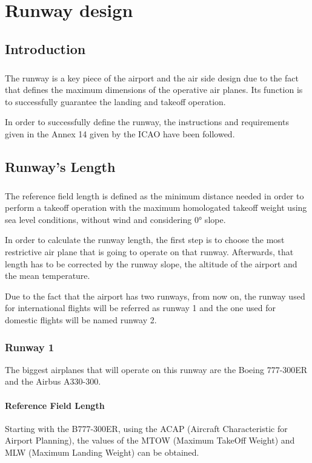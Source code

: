 \chapter{Runway design}

	\section{Introduction}
	\paragraph{} The runway is a key piece of the airport and the air side design due to the fact that defines the maximum dimensions of the operative air planes. Its function is to successfully guarantee the landing and takeoff operation.
	
	In order to successfully define the runway, the instructions and requirements given in the Annex 14 given by the ICAO have been followed. 

	\section{Runway's Length}
	\paragraph{} The reference field length is defined as the minimum distance needed in order to perform a takeoff operation with the maximum homologated takeoff weight using sea level conditions, without wind and considering 0° slope.  

	In order to calculate the runway length, the first step is to choose the most restrictive air plane that is going to operate on that runway. Afterwards, that length has to be corrected by the runway slope, the altitude of the airport and the mean temperature.

	Due to the fact that the airport has two runways, from now on, the runway used for international flights will be referred as runway 1 and the one used for domestic flights will be named runway 2. 
	
		\subsection{Runway 1}
		The biggest airplanes that will operate on this runway are the Boeing 777-300ER and the Airbus A330-300. 
		
			\subsubsection{Reference Field Length}
			Starting with the B777-300ER, using the ACAP (Aircraft Characteristic for Airport Planning), the values of the MTOW (Maximum TakeOff Weight) and MLW (Maximum Landing Weight) can be obtained. 
			
